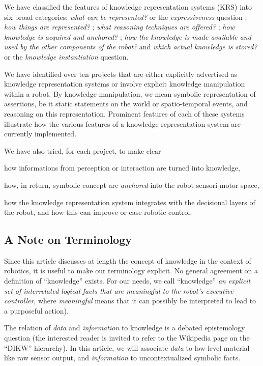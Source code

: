 \documentclass[a4paper, twocolumn]{article}
\begin{document}
We have classified the features of knowledge representation systems (KRS) into
six broad categories: \emph{what can be represented?} or the
\emph{expressiveness} question ; \emph{how things are represented?} ; \emph{what
reasoning techniques are offered?} ; \emph{how knowledge is acquired and
anchored?} ; \emph{how the knowledge is made available and used by the other
components of the robot?} and \emph{which actual knowledge is stored?} or the
\emph{knowledge instantiation} question.

We have identified over ten projects that are either explicitly advertised as
knowledge representation systems or involve explicit knowledge manipulation
within a robot. By knowledge manipulation, we mean symbolic representation of
assertions, be it static statements on the world or spatio-temporal events, and
reasoning on this representation. Prominent features of each of these systems
illustrate how the various features of a knowledge representation system are
currently implemented.

We have also tried, for each project, to make clear \begin{inparaenum} \item
how informations from perception or interaction are turned into knowledge,
\item how, in return, symbolic concept are \emph{anchored} into the robot
sensori-motor space, \item how the knowledge representation system integrates
with the decisional layers of the robot, and how this can improve or ease
robotic control.\end{inparaenum}

\subsection*{A Note on Terminology}

Since this article discusses at length the concept of knowledge in the context
of robotics, it is useful to make our terminology explicit.  No general
agreement on a definition of ``knowledge'' exists. For our needs, we call
``knowledge'' \emph{an explicit set of interrelated logical facts that are
meaningful to the robot's executive controller}, where \emph{meaningful} means
that it can possibly be interpreted to lead to a purposeful action).

The relation of \emph{data} and \emph{information} to knowledge is a debated
epistemology question (the interested reader is invited to refer to the
Wikipedia page on the ``DIKW'' hierarchy). In this article, we will associate
\emph{data} to low-level material like raw sensor output, and
\emph{information} to uncontextualized symbolic facts.
\end{document}
